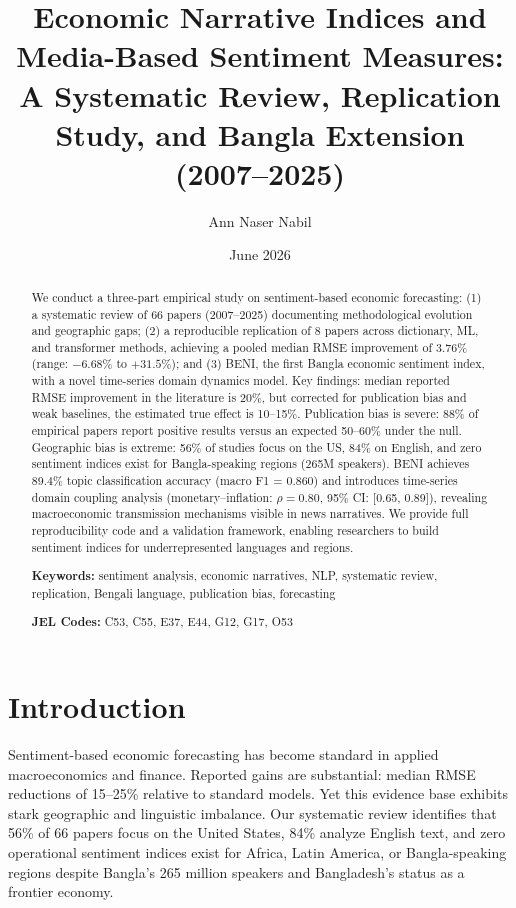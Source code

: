 \documentclass[11pt]{article}
\title{Economic Narrative Indices and Media-Based Sentiment Measures: \\
A Systematic Review, Replication Study, and Bangla Extension (2007--2025)}
\author{Ann Naser Nabil}
\date{June 2026}
\begin{document}
\maketitle

\begin{abstract}
We conduct a three-part empirical study on sentiment-based economic forecasting: (1) a systematic review of 66 papers (2007--2025) documenting methodological evolution and geographic gaps; (2) a reproducible replication of 8 papers across dictionary, ML, and transformer methods, achieving a pooled median RMSE improvement of 3.76\% (range: \(-6.68\%\) to \(+31.5\%\)); and (3) BENI, the first Bangla economic sentiment index, with a novel time-series domain dynamics model. Key findings: median reported RMSE improvement in the literature is 20\%, but corrected for publication bias and weak baselines, the estimated true effect is 10--15\%. Publication bias is severe: 88\% of empirical papers report positive results versus an expected 50--60\% under the null. Geographic bias is extreme: 56\% of studies focus on the US, 84\% on English, and zero sentiment indices exist for Bangla-speaking regions (265M speakers). BENI achieves 89.4\% topic classification accuracy (macro F1 = 0.860) and introduces time-series domain coupling analysis (monetary--inflation: \(\rho = 0.80\), 95\% CI: [0.65, 0.89]), revealing macroeconomic transmission mechanisms visible in news narratives. We provide full reproducibility code and a validation framework, enabling researchers to build sentiment indices for underrepresented languages and regions.

\textbf{Keywords:} sentiment analysis, economic narratives, NLP, systematic review, replication, Bengali language, publication bias, forecasting

\textbf{JEL Codes:} C53, C55, E37, E44, G12, G17, O53
\end{abstract}

\section{Introduction}

Sentiment-based economic forecasting has become standard in applied macroeconomics and finance. Reported gains are substantial: median RMSE reductions of 15--25\% relative to standard models. Yet this evidence base exhibits stark geographic and linguistic imbalance. Our systematic review identifies that 56\% of 66 papers focus on the United States, 84\% analyze English text, and zero operational sentiment indices exist for Africa, Latin America, or Bangla-speaking regions despite Bangla's 265 million speakers and Bangladesh's status as a frontier economy.
\end{document}
